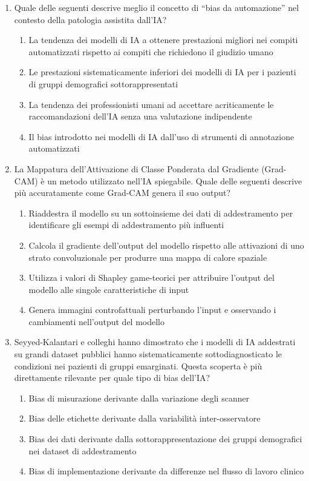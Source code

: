 \begin{enumerate}
    \item \label{ch5:q3} Quale delle seguenti descrive meglio il concetto di ``bias da automazione'' nel contesto della patologia assistita dall'IA?
    \begin{enumerate}[label=\Alph*.]
        \item La tendenza dei modelli di IA a ottenere prestazioni migliori nei compiti automatizzati rispetto ai compiti che richiedono il giudizio umano
        \item Le prestazioni sistematicamente inferiori dei modelli di IA per i pazienti di gruppi demografici sottorappresentati
        \item La tendenza dei professionisti umani ad accettare acriticamente le raccomandazioni dell'IA senza una valutazione indipendente
        \item Il bias introdotto nei modelli di IA dall'uso di strumenti di annotazione automatizzati
    \end{enumerate}

    \item \label{ch5:q4} La Mappatura dell'Attivazione di Classe Ponderata dal Gradiente (Grad-CAM) è un metodo utilizzato nell'IA spiegabile. Quale delle seguenti descrive più accuratamente come Grad-CAM genera il suo output?
    \begin{enumerate}[label=\Alph*.]
        \item Riaddestra il modello su un sottoinsieme dei dati di addestramento per identificare gli esempi di addestramento più influenti
        \item Calcola il gradiente dell'output del modello rispetto alle attivazioni di uno strato convoluzionale per produrre una mappa di calore spaziale
        \item Utilizza i valori di Shapley game-teorici per attribuire l'output del modello alle singole caratteristiche di input
        \item Genera immagini controfattuali perturbando l'input e osservando i cambiamenti nell'output del modello
    \end{enumerate}

    \item \label{ch5:q5} Seyyed-Kalantari e colleghi hanno dimostrato che i modelli di IA addestrati su grandi dataset pubblici hanno sistematicamente sottodiagnosticato le condizioni nei pazienti di gruppi emarginati. Questa scoperta è più direttamente rilevante per quale tipo di bias dell'IA?
    \begin{enumerate}[label=\Alph*.]
        \item Bias di misurazione derivante dalla variazione degli scanner
        \item Bias delle etichette derivante dalla variabilità inter-osservatore
        \item Bias dei dati derivante dalla sottorappresentazione dei gruppi demografici nei dataset di addestramento
        \item Bias di implementazione derivante da differenze nel flusso di lavoro clinico
    \end{enumerate}


\end{enumerate}
